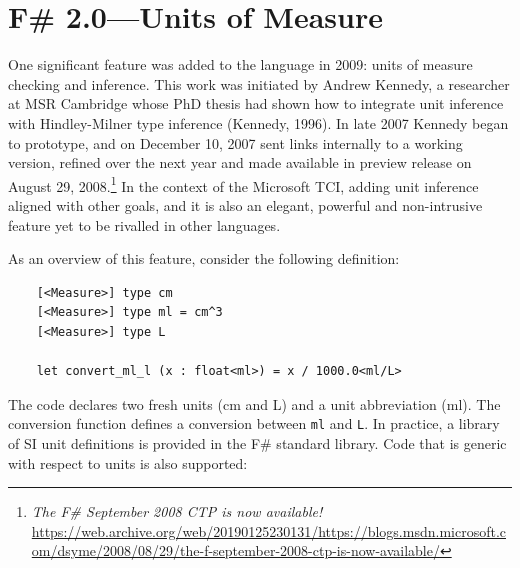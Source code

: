 \documentclass[acmsmall]{acmart}\settopmatter{}
\begin{document}
\section*{F\# 2.0---Units of Measure }

One significant feature was added to the language in 2009: units of measure checking and inference.  This
work was initiated by Andrew Kennedy, a researcher at MSR Cambridge whose PhD thesis had shown how to integrate
unit inference with Hindley-Milner type inference (Kennedy, 1996). In late 2007 Kennedy began to prototype, and on
December 10, 2007 sent links internally to a working version, refined over the next year and made available in preview
release on August 29, 2008.\footnote{\textit{The F\# September 2008 CTP is now available!} \url{https://web.archive.org/web/20190125230131/https://blogs.msdn.microsoft.com/dsyme/2008/08/29/the-f-september-2008-ctp-is-now-available/}}
In the context of the Microsoft TCI, adding unit inference aligned with other goals, and it
is also an elegant, powerful and non-intrusive feature yet to be rivalled in other languages.

As an overview of this feature, consider the following definition:

\begin{verbatim}
    [<Measure>] type cm
    [<Measure>] type ml = cm^3
    [<Measure>] type L

    let convert_ml_l (x : float<ml>) = x / 1000.0<ml/L>
\end{verbatim}

The code declares two fresh units (cm and L) and a unit abbreviation (ml).  The conversion function defines a conversion
between \texttt{ml} and \texttt{L}.  In practice, a library of SI unit definitions is provided in the F\# standard library.  Code
that is generic with respect to units is also supported:
\end{document}
